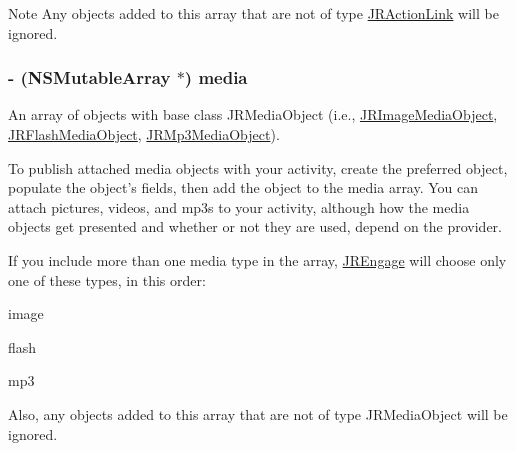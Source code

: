 \begin{DoxyNote}{Note}
Any objects added to this array that are not of type {\ttfamily \hyperlink{interface_j_r_action_link}{JRActionLink}} will be ignored. 
\end{DoxyNote}
\hypertarget{interface_j_r_activity_object_a2e4ff78f83d0f353f8e0c17ed48ce0ab}{
\subsubsection[{media}]{\setlength{\rightskip}{0pt plus 5cm}-\/ (NSMutableArray $\ast$) media}}
\label{interface_j_r_activity_object_a2e4ff78f83d0f353f8e0c17ed48ce0ab}
An array of objects with base class {\ttfamily JRMediaObject} (i.e., \hyperlink{interface_j_r_image_media_object}{JRImageMediaObject}, \hyperlink{interface_j_r_flash_media_object}{JRFlashMediaObject}, \hyperlink{interface_j_r_mp3_media_object}{JRMp3MediaObject}).

To publish attached media objects with your activity, create the preferred object, populate the object's fields, then add the object to the {\ttfamily media} array. You can attach pictures, videos, and mp3s to your activity, although how the media objects get presented and whether or not they are used, depend on the provider.

If you include more than one media type in the array, \hyperlink{interface_j_r_engage}{JREngage} will choose only one of these types, in this order:
\begin{DoxyEnumerate}
\item image
\item flash
\item mp3
\end{DoxyEnumerate}

Also, any objects added to this array that are not of type {\ttfamily JRMediaObject} will be ignored.

